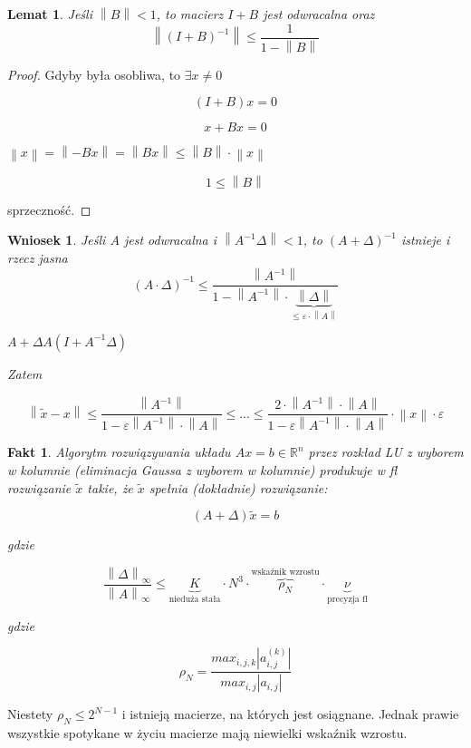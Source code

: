 \documentclass[hidelinks,a4paper]{article}
\newcommand{\RR}{\mathbb{R}}
\newcommand{\norm}[1]{\left\lVert#1\right\rVert}
\newtheorem{wniosek}{Wniosek}
\newtheorem{fakt}{Fakt}
\newtheorem{lemat}{Lemat}
\begin{document}
\begin{lemat} Jeśli $\norm{B} < 1$, to macierz $I + B$ jest odwracalna oraz
	\[
		\norm{(I + B)^{-1}} \leq \frac{1}{1 - \norm{B}}
	\]
\end{lemat}

\begin{proof}
	Gdyby była osobliwa, to $\exists x \neq 0$
	    
	\[
		(I + B)x = 0
	\]
	    
	\[
		x + Bx = 0
	\]
	    
	$\norm{x} = \norm{-Bx} = \norm{Bx} \leq \norm{B} \cdot \norm{x}$
	    
	\[
		1 \leq \norm{B}
	\]
	    
	sprzeczność.
\end{proof}

\begin{wniosek} Jeśli $A$ jest odwracalna i $\norm{A ^ {-1} \Delta} < 1$, to $(A + \Delta)^{-1}$ istnieje i rzecz jasna
	\[
		(A \cdot \Delta)^{-1} \leq \frac{\norm{A^{-1}}}{1 - \norm{A^{-1}} \cdot \underbrace{\norm{\Delta}}_{\leq \varepsilon \cdot \norm{A}}}
	\]
	
	$A + \Delta  A(I + A^{-1} \Delta)$
	
	Zatem
	
	\[
		\norm{\tilde{x} - x} \leq \frac{\norm{A^{-1}}}{1 - \varepsilon \norm{A^{-1}} \cdot \norm{A}} \leq ... \leq \frac{2 \cdot \norm{A^{-1}} \cdot \norm{A}}{1 - \varepsilon \norm{A^{-1}} \cdot \norm{A}} \cdot \norm{x} \cdot \varepsilon
	\]
\end{wniosek}

\begin{fakt} Algorytm rozwiązywania układu $Ax = b \in \RR^n$ przez rozkład LU z wyborem w kolumnie (eliminacja Gaussa z wyborem w kolumnie) produkuje w fl rozwiązanie $\tilde{x}$ takie, że $\tilde{x}$ spełnia (dokładnie) rozwiązanie:
	
	\[
		(A + \Delta)\tilde{x} = b
	\]
	
	gdzie
	
	\[
		\frac{\norm{\Delta}_\infty}{\norm{A}_\infty} \leq \underbrace{K}_{\textrm{nieduża stała}} \cdot N^3 \cdot \overbrace{\rho_N}^{\textrm{wskaźnik wzrostu}} \cdot \underbrace{\nu}_{\textrm{precyzja fl}}
	\]
	
	gdzie
	
	\[
		\rho_N = \frac{max_{i, j, k} |a_{i, j}^{(k)}|}{max_{i, j}|a_{i,j}|}
	\]
\end{fakt}

Niestety $\rho_N \leq 2^{N-1}$ i istnieją macierze, na których jest osiągnane. Jednak prawie wszystkie spotykane w życiu macierze mają niewielki wskaźnik wzrostu.
\end{document}
